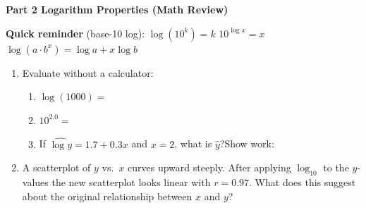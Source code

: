 \documentclass[10pt]{article}
\begin{document}
{\large\bfseries\color{navy} Part 2 \quad Logarithm Properties (Math Review)}

\vspace{0.12in}

\begin{tcolorbox}[colback=greenbg, colframe=greenacc, boxrule=0.8pt, arc=2mm,
    left=4mm, right=4mm, top=3mm, bottom=3mm]
    \small
    \textbf{Quick reminder} (base-10 log):\quad
    $\log(10^k) = k$ \quad $10^{\log x} = x$ \quad
    $\log(a \cdot b^x) = \log a + x\log b$
\end{tcolorbox}

\vspace{0.14in}

\begin{enumerate}[leftmargin=1.6em, itemsep=0.18in, resume]

  \item Evaluate without a calculator:

        \begin{enumerate}[label=\textbf{(\alph*)}, leftmargin=1.6em, itemsep=6pt]
          \item $\log(1000) = $ \blank{2.5cm}
          \item $10^{2.0} = $ \blank{2.5cm}
          \item If $\widehat{\log y} = 1.7 + 0.3x$ and $x = 2$,
                what is $\hat{y}$?\quad Show work: \blank{4cm}
        \end{enumerate}

  \item A scatterplot of $y$ vs.\ $x$ curves upward steeply. After applying $\log_{10}$ to
        the $y$-values the new scatterplot looks linear with $r = 0.97$.
        What does this suggest about the original relationship between $x$ and $y$?\\[8pt]
        \writeline\\[1pt]\writeline\\[1pt]\writeline

\end{enumerate}
\end{document}
